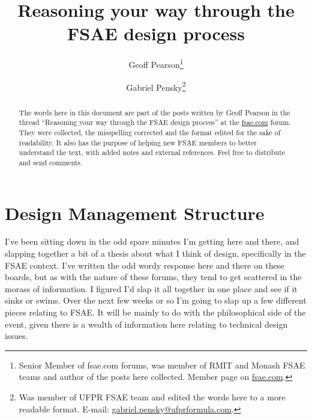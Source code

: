 \documentclass[10pt, a4paper, article, oneside, twocolumn, final]{memoir}
\begin{document}
\title{Reasoning your way through the FSAE design process}
\author{Geoff Pearson\thanks{Senior Member of fsae.com forums, was member of RMIT and Monash FSAE teams and author of the posts here collected. Member page on \href{http://www.fsae.com/forums/member.php?2511-Big-Bird}{fsae.com}.} \and Gabriel Pensky\thanks{Was member of UFPR FSAE team and edited the words here to a more readable format. E-mail: \href{mailto:gabriel.pensky@ufprformula.com}{gabriel.pensky@ufprformula.com}.}}
\maketitle



\begin{abstract}
    The words here in this document are part of the posts written by Geoff Pearson in the thread  “Reasoning your way through the FSAE design process” at the \href{http://www.fsae.com/forums/showthread.php?362-Reasoning-your-way-through-the-FSAE-design-process}{fsae.com} forum. They were collected, the misspelling corrected and the format edited for the sake of readability. It also has the purpose of helping new FSAE members to better understand the text, with added notes and external references. Feel free to distribute and send comments.
\end{abstract}



\chapter*{Design Management Structure}

I’ve been sitting down in the odd spare minutes I’m getting here and there, and slapping together a bit of a thesis about what I think of design, specifically in the FSAE context. I’ve written the odd wordy response here and there on these boards, but as with the nature of these forums, they tend to get scattered in the morass of information. I figured I’d slap it all together in one place and see if it sinks or swims. Over the next few weeks or so I’m going to slap up a few different pieces relating to FSAE. It will be mainly to do with the philosophical side of the event, given there is a wealth of information here relating to technical design issues. 
\end{document}
